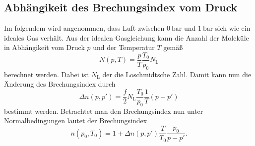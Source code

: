 \subsection{Abhängikeit des Brechungsindex vom Druck}
\label{subsec:Brechungsindex}
Im folgendem wird angenommen, dass Luft zwischen $\qty{0}{\bar}$ und $\qty{1}{\bar}$ sich wie ein ideales Gas verhält. Aus der idealen Gasgleichung kann die Anzahl der Moleküle
in Abhängikeit vom Druck $p$ und der Temperatur $T$ gemäß 
\begin{equation*}
    N(p,T) = \frac{p}{T}\frac{T_0}{p_0}N_\text{L}
\end{equation*}
berechnet werden. Dabei ist $N_\text{L}$ der die Loschmidtsche Zahl. 
Damit kann nun die Änderung des Brechungsindex durch 
\begin{equation*}
    \Delta n(p,p') = \frac{f}{2}N_\text{L}\frac{T_0}{p_0}\frac{1}{T}(p - p')
\end{equation*}
bestimmt werden.
Betrachtet man den Brechungsindex nun unter Normalbedingungen lautet der Brechungsindex 
\begin{equation}
    \label{eqn:Brechungsindex}
    n(p_0, T_0) = 1 + \Delta n(p,p')\frac{T}{T_0}\frac{p_0}{p - p'}.
\end{equation}
